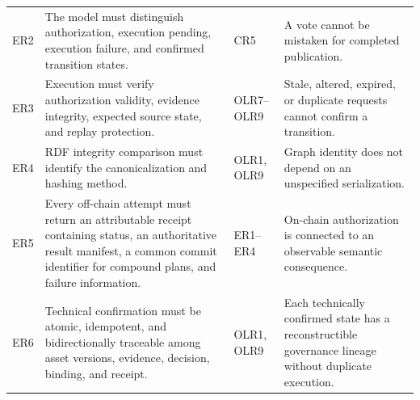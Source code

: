 \documentclass[journal]{IEEEtran}
\begin{document}
\begin{table}[t]
\begin{tabular}{p{1.0cm}p{6.2cm}p{2.1cm}p{6.9cm}}
ER2 &
The model must distinguish authorization, execution pending,
execution failure, and confirmed transition states. &
CR5 &
A vote cannot be mistaken for completed publication.\\

ER3 &
Execution must verify authorization validity, evidence integrity,
expected source state, and replay protection. &
OLR7--OLR9 &
Stale, altered, expired, or duplicate requests cannot confirm
a transition.\\

ER4 &
RDF integrity comparison must identify the canonicalization
and hashing method. &
OLR1, OLR9 &
Graph identity does not depend on an unspecified serialization.\\

ER5 &
Every off-chain attempt must return an attributable receipt
containing status, an authoritative result manifest, a common
commit identifier for compound plans, and failure information. &
ER1--ER4 &
On-chain authorization is connected to an observable
semantic consequence.\\

ER6 &
Technical confirmation must be atomic, idempotent, and
bidirectionally traceable among asset versions, evidence,
decision, binding, and receipt. &
OLR1, OLR9 &
Each technically confirmed state has a reconstructible
governance lineage without duplicate execution.\\

\hline
\end{tabular}
\end{table}



\end{document}
